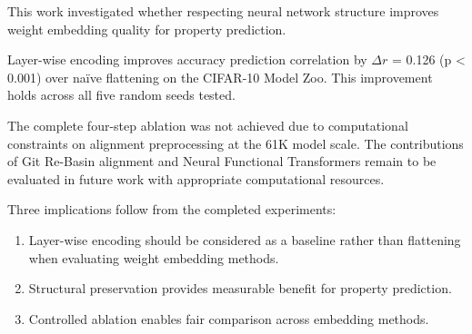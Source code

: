 
This work investigated whether respecting neural network structure improves weight embedding quality for property prediction.

Layer-wise encoding improves accuracy prediction correlation by $\Delta r$ = 0.126 (p < 0.001) over naïve flattening on the CIFAR-10 Model Zoo. This improvement holds across all five random seeds tested.

The complete four-step ablation was not achieved due to computational constraints on alignment preprocessing at the 61K model scale. The contributions of Git Re-Basin alignment and Neural Functional Transformers remain to be evaluated in future work with appropriate computational resources.

Three implications follow from the completed experiments:

\begin{enumerate}
\item Layer-wise encoding should be considered as a baseline rather than flattening when evaluating weight embedding methods.
\item Structural preservation provides measurable benefit for property prediction.
\item Controlled ablation enables fair comparison across embedding methods.
\end{enumerate}
